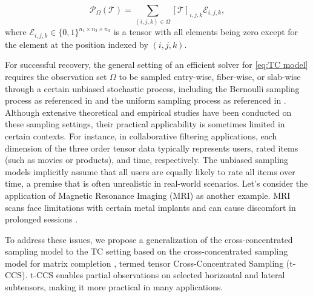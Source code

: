 \documentclass[twoside,12pt]{article}
\def\tX{\mathcal{T}}
\def\tX{\mathcal{T}}
\begin{document}
\begin{equation}
\label{def:sampling_operation}
\mathcal{P}_{\Omega}(\tX)=\sum\limits_{(i,j,k)\in \Omega}[\tX]_{i,j,k}\mathcal{E}_{i,j,k},
\end{equation}
where  $\mathcal{E}_{i,j,k}\in\{0,1\}^{n_1\times n_2\times n_3}$ is a tensor with all elements being zero except for the element at the position indexed by $(i,j,k)$.

For successful recovery, the general setting of an efficient solver for \eqref{eq:TC model} requires the observation set $\Omega$ to be sampled entry-wise, fiber-wise, or slab-wise through a certain unbiased stochastic process, including the Bernoulli sampling process as referenced in\citep{bernoulli8,bernoulli7,bernoulli9,bernoulli5} and the uniform sampling process as referenced in \citep{Jain20141431,SONG2023348,zhang2017exact}. Although extensive theoretical and empirical studies have been conducted on these sampling settings, their practical applicability is sometimes limited in certain contexts. For instance, in collaborative filtering applications, each dimension of the three order tensor data typically represents users, rated items (such as movies or products), and time, respectively. The unbiased sampling models    implicitly assume that all users are equally likely to rate all items over time, a premise that is often unrealistic in real-world scenarios.  Let's consider the application of Magnetic Resonance Imaging (MRI) as another example.  MRI scans face limitations with certain metal implants and can cause discomfort in prolonged sessions \citep{mri_limitation}. 

To address these issues, we propose a generalization of the cross-concentrated sampling model to the TC setting based on the cross-concentrated sampling model for matrix completion \citep{cai2023matrix}, termed tensor Cross-Concentrated Sampling (t-CCS). t-CCS enables partial observations on selected horizontal and lateral subtensors, making it more practical in many applications.    
\end{document}
